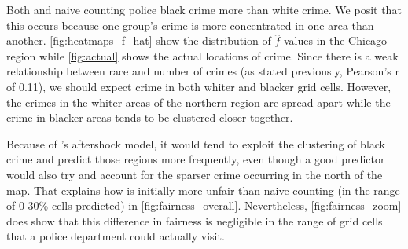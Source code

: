 Both \pp and naive counting police black crime more than white crime. We posit that this occurs because one group's crime is more concentrated in one area than another. \autoref{fig:heatmaps_f_hat} show the distribution of $\hat{f}$ values in the Chicago region while \autoref{fig:actual} shows the actual locations of crime. Since there is a weak relationship between race and number of crimes (as stated previously, Pearson's r of 0.11), we should expect crime in both whiter and blacker grid cells. However, the crimes in the whiter areas of the northern region are spread apart while the crime in blacker areas tends to be clustered closer together.

Because of \pp's aftershock model, it would tend to exploit the clustering of black crime and predict those regions more frequently, even though a good predictor would also try and account for the sparser crime occurring in the north of the map. That explains how \pp is initially more unfair than naive counting (in the range of 0-30\% cells predicted) in \autoref{fig:fairness_overall}. Nevertheless, \autoref{fig:fairness_zoom} does show that this difference in fairness is negligible in the range of grid cells that a police department could actually visit.

